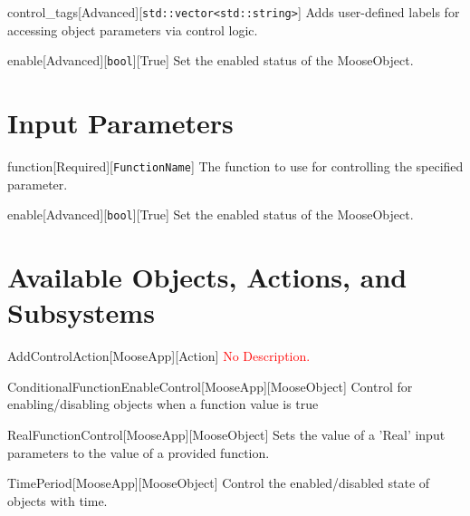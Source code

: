 \begin{InputParameter}{control\_tags}[Advanced][\texttt{std::vector{\textless}std::string{\textgreater}}]
Adds user-defined labels for accessing object parameters via control logic.
\end{InputParameter}

\begin{InputParameter}{enable}[Advanced][\texttt{bool}][True]
Set the enabled status of the MooseObject.
\end{InputParameter}

\section{\label{input-parameters}Input Parameters}
\begin{InputParameter}{function}[Required][\texttt{FunctionName}]
The function to use for controlling the specified parameter.
\end{InputParameter}

\begin{InputParameter}{enable}[Advanced][\texttt{bool}][True]
Set the enabled status of the MooseObject.
\end{InputParameter}

\section{\label{available-objects-actions-and-subsystems}Available Objects, Actions, and Subsystems}
\begin{ObjectDescription}{AddControlAction}[MooseApp][Action]
\textcolor{red}{No Description.}
\end{ObjectDescription}

\begin{ObjectDescription}{ConditionalFunctionEnableControl}[MooseApp][MooseObject]
Control for enabling/disabling objects when a function value is true
\end{ObjectDescription}

\begin{ObjectDescription}{RealFunctionControl}[MooseApp][MooseObject]
Sets the value of a 'Real' input parameters to the value of a provided function.
\end{ObjectDescription}

\begin{ObjectDescription}{TimePeriod}[MooseApp][MooseObject]
Control the enabled/disabled state of objects with time.
\end{ObjectDescription}

